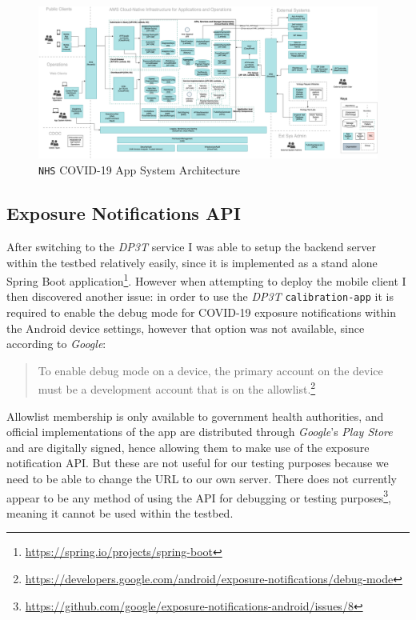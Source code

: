 \documentclass[
    author={Jacob Daniel Halsey},
    supervisor={Prof. Awais Rashid},
    degree={BSc},
    title={Building a Testbed for Evaluating Privacy Enhancing Technologies  (PETs)},
    subtitle={},
    type={software development},
    year={2021}
]{dissertation}
\begin{document}
\begin{figure}
	\centering
	\includegraphics[width=16cm]{img/nhs-covid}
	\caption{\texttt{NHS} COVID-19 App System Architecture}
\end{figure}

\subsection{Exposure Notifications API}
\label{sect:exposure}

After switching to the \emph{DP3T} service I was able to setup the backend server within
the testbed relatively easily, since it is implemented as a stand alone Spring Boot 
application\footnote{\url{https://spring.io/projects/spring-boot}}. However when attempting
to deploy the mobile client I then discovered another issue: in order to 
use the \emph{DP3T} \texttt{calibration-app}
it is required to enable the debug mode for COVID-19 exposure notifications within the
Android device settings, however that option was not available, since according to \emph{Google}:

\begin{quotation}
	To enable debug mode on a device, the primary account on the device must be a development account that is on the allowlist.\footnote{\url{https://developers.google.com/android/exposure-notifications/debug-mode}}
\end{quotation}

Allowlist membership is only available to government health authorities, and
official implementations of the app are distributed through \emph{Google}'s \emph{Play Store} and are
digitally signed, hence allowing them to make use of the exposure notification API. But these are not useful
for our testing purposes because we need to be able to change the URL to our own server. There does not
currently appear to be any method of using the API for debugging or testing 
purposes\footnote{\url{https://github.com/google/exposure-notifications-android/issues/8}}, meaning it cannot
be used within the testbed.\\
\end{document}

